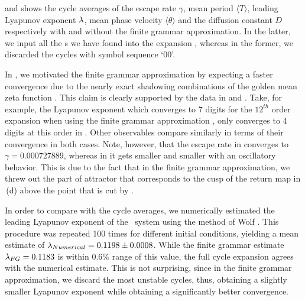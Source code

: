  and  shows
the cycle averages of the escape rate $\gamma$, mean period
$\langle T \rangle$, leading Lyapunov exponent $\lambda$, mean phase velocity
$\langle \dot{\theta} \rangle$ and the diffusion constant $D$ respectively
with and without the finite grammar approximation. In the latter, we input
all the \rpo s we have found into the expansion
, whereas in the former, we discarded the
cycles with symbol sequence `00'.




In , we motivated the finite grammar approximation by expecting a faster convergence
due to the nearly exact shadowing combinations of the golden mean zeta function
. This claim is clearly supported by the
data in  and
. Take, for example, the Lyapunov exponent
which converges to $7$ digits for the $12^{th}$ order expansion when using the finite
grammar approximation
, only converges to $4$ digits at this order in
. Other observables compare similarly in
terms of their convergence in both cases. Note, however, that the escape rate
in  converges to $\gamma = 0.000727889$, whereas
in  it gets smaller and smaller with an
oscillatory behavior. This is due to the fact that in the finite grammar
approximation, we threw out the part of attractor that corresponds to the
cusp of the return map in \,(d) above the point that
is cut by .

In order to compare with the cycle averages, we numerically estimated the
leading Lyapunov exponent of the \twomode\ system using the method of
Wolf \etal{}. This procedure was repeated 100 times for
different initial conditions, yielding a mean estimate of
$\lambda_{Numerical} = 0.1198 \pm 0.0008$. While the finite grammar
estimate $\lambda_{FG} = 0.1183$ is within $0.6\%$ range of this value,
the full cycle expansion agrees with the numerical estimate. This is not
surprising, since in the finite grammar approximation, we discard the
most unstable cycles, thus, obtaining a slightly smaller Lyapunov
exponent while obtaining a significantly better convergence.
